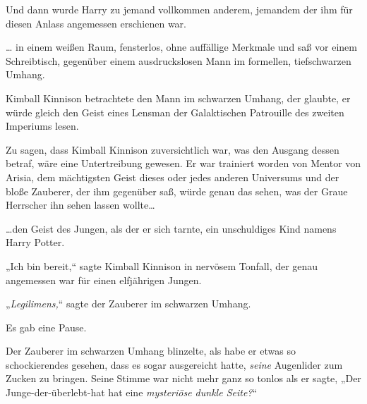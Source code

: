 Und dann wurde Harry zu jemand vollkommen anderem, jemandem der ihm für diesen Anlass angemessen erschienen war.

… in einem weißen Raum, fensterlos, ohne auffällige Merkmale und saß vor einem Schreibtisch, gegenüber einem ausdruckslosen Mann im formellen, tiefschwarzen Umhang.

Kimball Kinnison betrachtete den Mann im schwarzen Umhang, der glaubte, er würde gleich den Geist eines Lensman der Galaktischen Patrouille des zweiten Imperiums lesen.

Zu sagen, dass Kimball Kinnison zuversichtlich war, was den Ausgang dessen betraf, wäre eine Untertreibung gewesen. Er war trainiert worden von Mentor von Arisia, dem mächtigsten Geist dieses oder jedes anderen Universums und der bloße Zauberer, der ihm gegenüber saß, würde genau das sehen, was der Graue Herrscher ihn sehen lassen wollte…

…den Geist des Jungen, als der er sich tarnte, ein unschuldiges Kind namens Harry Potter.

„Ich bin bereit,“ sagte Kimball Kinnison in nervösem Tonfall, der genau angemessen war für einen elfjährigen Jungen.

„\emph{Legilimens,}“ sagte der Zauberer im schwarzen Umhang.

Es gab eine Pause.

Der Zauberer im schwarzen Umhang blinzelte, als habe er etwas so schockierendes gesehen, dass es sogar ausgereicht hatte, \emph{seine} Augenlider zum Zucken zu bringen. Seine Stimme war nicht mehr ganz so tonlos als er sagte, „Der Junge-der-überlebt-hat hat eine \emph{mysteriöse dunkle Seite?}“

